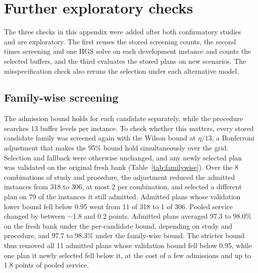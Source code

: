 \section{Further exploratory checks}\label{sec:checks}

The three checks in this appendix were added after both confirmatory studies and are exploratory. The first reuses the stored screening counts, the second times screening and one HGS solve on each development instance and counts the selected buffers, and the third evaluates the stored plans on new scenarios. The misspecification check also reruns the selection under each alternative model.

\subsection{Family-wise screening}\label{sec:familywise}

The admission bound holds for each candidate separately, while the procedure searches 13 buffer levels per instance. To check whether this matters, every stored candidate family was screened again with the Wilson bound at $\eta/13$, a Bonferroni adjustment that makes the 95\% bound hold simultaneously over the grid. Selection and fallback were otherwise unchanged, and any newly selected plan was validated on the original fresh bank (Table~\ref{tab:familywise}). Over the 8 combinations of study and procedure, the adjustment reduced the admitted instances from 318 to 306, at most 2 per combination, and selected a different plan on 79 of the instances it still admitted. Admitted plans whose validation lower bound fell below 0.95 went from 11 of 318 to 1 of 306. Pooled service changed by between $-$1.8 and 0.2 points. Admitted plans averaged 97.3 to 98.0\% on the fresh bank under the per-candidate bound, depending on study and procedure, and 97.7 to 98.3\% under the family-wise bound. The stricter bound thus removed all 11 admitted plans whose validation bound fell below 0.95, while one plan it newly selected fell below it, at the cost of a few admissions and up to 1.8 points of pooled service.

